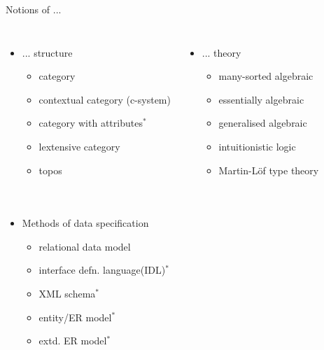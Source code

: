 \documentclass[xcolor=pst,dvips]{beamer}   %
\begin{document}
\begin{frame}{Notions of ...}
\begin{columns}[t]
\column{7.0cm}
\begin{itemize}
\item {... structure
   \begin{itemize}
	    \item category
			\item contextual category (c-system)
			\item category with attributes$^*$
			\item lextensive category
			\item topos
	 \end{itemize}
	}
	\end{itemize}
\column{5cm}
\begin{itemize}
	\item {... theory
   \begin{itemize}
	    \item many-sorted algebraic
			\item essentially algebraic
			\item generalised algebraic
			\item intuitionistic logic
			\item Martin-L\"of type theory
	 \end{itemize}
	}
	\end{itemize}
\end{columns}
\begin{columns}[t]
\column{6.0cm}
\pause \begin{itemize}
\item {Methods of data specification
   \begin{itemize}
	    \item relational data model
			\item interface defn. language{\scriptsize(IDL)}$^*$
			\item {\scriptsize XML} schema$^*$
			\item entity/{\scriptsize ER} model$^*$
			\item extd. {\scriptsize ER} model$^*$
	 \end{itemize}
	 }
\end{itemize}
\column{4cm}
\end{columns}
\iffalse
\onslide<5-7> \ncdiag[linecolor=red,linewidth=2pt,angleA=0, angleB=0, armA=0.5, armB=0.8, linearc=.2]{->}{ER}{XML}
\onslide<6-7> \ncdiag[linecolor=red,linewidth=2pt,angleA=0, angleB=0, armA=2.5, armB=0.5, linearc=.2]{->}{ER}{IDL}
\onslide<7> \ncdiag[linecolor=red,linewidth=2pt,angleA=0, angleB=0, armA=2.8, armB=1.95, linearc=.2]{->}{ER}{RDB}
\fi
\end{frame}
\end{document}
